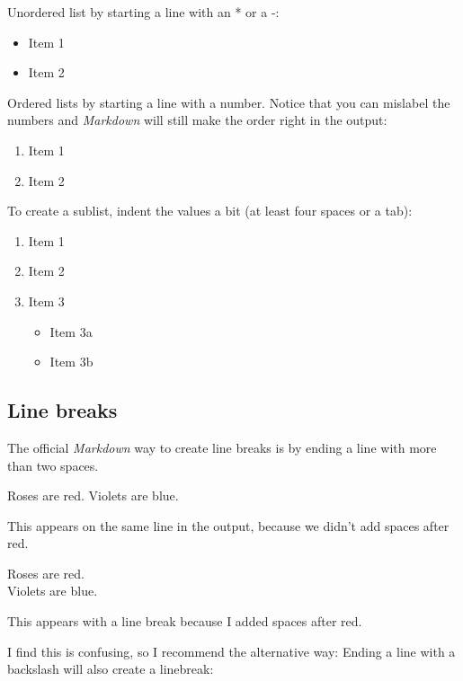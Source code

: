 \documentclass[a4paper, twoside]{templates/ociamthesis}
\providecommand{\tightlist}{%
  \setlength{\itemsep}{0pt}\setlength{\parskip}{0pt}}
\begin{document}
Unordered list by starting a line with an * or a -:

\begin{itemize}
\tightlist
\item
  Item 1
\item
  Item 2
\end{itemize}

Ordered lists by starting a line with a number.
Notice that you can mislabel the numbers and \emph{Markdown} will still make the order right in the output:

\begin{enumerate}
\def\labelenumi{\arabic{enumi}.}
\tightlist
\item
  Item 1
\item
  Item 2
\end{enumerate}

To create a sublist, indent the values a bit (at least four spaces or a tab):

\begin{enumerate}
\def\labelenumi{\arabic{enumi}.}
\tightlist
\item
  Item 1
\item
  Item 2
\item
  Item 3

  \begin{itemize}
  \tightlist
  \item
    Item 3a
  \item
    Item 3b
  \end{itemize}
\end{enumerate}

\hypertarget{line-breaks}{%
\subsection{Line breaks}\label{line-breaks}}

The official \emph{Markdown} way to create line breaks is by ending a line with more than two spaces.

Roses are red.
Violets are blue.

This appears on the same line in the output, because we didn't add spaces after red.

Roses are red.\\
Violets are blue.

This appears with a line break because I added spaces after red.

I find this is confusing, so I recommend the alternative way: Ending a line with a backslash will also create a linebreak:
\end{document}
